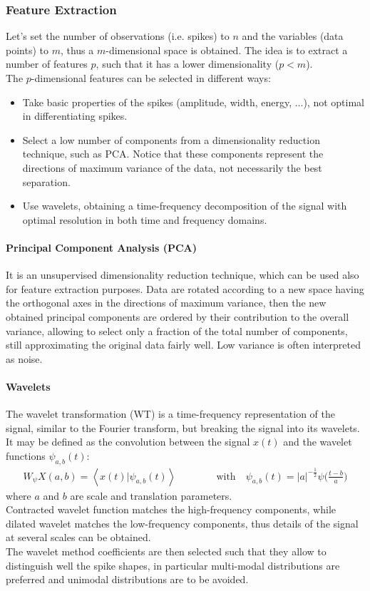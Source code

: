 \subsubsection{Feature Extraction}
Let's set the number of observations (i.e. spikes) to \(n\) and the
variables (data points) to \(m\), thus a \(m\)-dimensional space is obtained.
The idea is to extract a number of features \(p\), such that it has a lower
dimensionality (\(p<m\)).\\
The \(p\)-dimensional features can be selected in different ways:
\begin{itemize}
    \item Take basic properties of the spikes (amplitude, width, energy, ...),
    not optimal in differentiating spikes.
    \item Select a low number of components from a dimensionality reduction
    technique, such as PCA. Notice that these components represent the directions
    of maximum variance of the data, not necessarily the best separation.
    \item Use wavelets, obtaining a time-frequency decomposition of the signal
    with optimal resolution in both time and frequency domains.
\end{itemize}
\paragraph{Principal Component Analysis (PCA)}
It is an unsupervised dimensionality reduction technique, which can be used
also for feature extraction purposes. Data are rotated according to a new space
having the orthogonal axes in the directions of maximum variance, then the new
obtained principal components are ordered by their contribution to the overall
variance, allowing to select only a fraction of the total number of components,
still approximating the original data fairly well. Low variance is often
interpreted as noise.
\paragraph{Wavelets}
The wavelet transformation (WT) is a time-frequency representation of the signal,
similar to the Fourier transform, but breaking the signal into its wavelets.
It may be defined as the convolution between the signal \(x(t)\) and the
wavelet functions \(\psi_{a,b}(t)\):
\begin{align*}
    W_\psi X(a,b)=\left\langle x(t)|\psi_{a,b}(t) \right\rangle
    \quad\quad\quad\quad\text{with}\quad
    \psi_{a,b}(t)=|a|^{-\frac{1}{2}}\psi\biggl(\frac{t-b}{a}\biggr)
\end{align*}
where \(a\) and \(b\) are scale and translation parameters.\\
Contracted wavelet function matches the high-frequency components, while
dilated wavelet matches the low-frequency components, thus details of the signal
at several scales can be obtained.\\
The wavelet method coefficients are then selected such that they allow to
distinguish well the spike shapes, in particular multi-modal distributions
are preferred and unimodal distributions are to be avoided.
